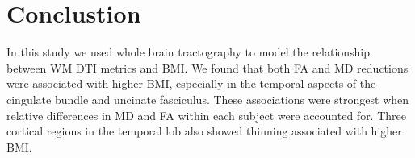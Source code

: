 \section{Conclustion}

In this study we used whole brain tractography to model the relationship between WM DTI metrics and BMI. We found that both FA and MD reductions were associated with higher BMI, especially in the temporal aspects of the cingulate bundle and uncinate fasciculus. These associations were strongest when relative differences in MD and FA within each subject were accounted for. Three cortical regions in the temporal lob also showed thinning associated with higher BMI.
